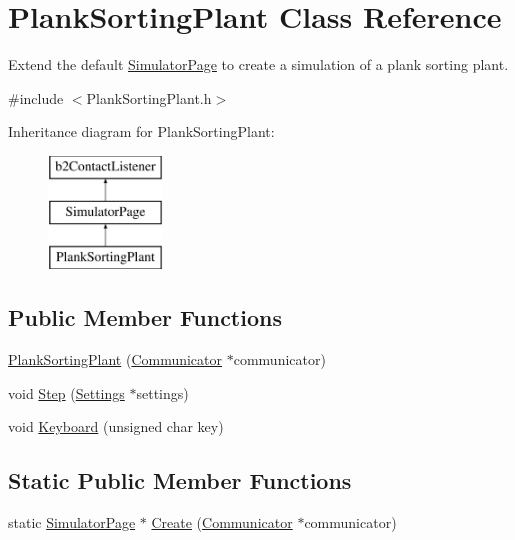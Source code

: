 \hypertarget{classPlankSortingPlant}{\section{Plank\-Sorting\-Plant Class Reference}
\label{classPlankSortingPlant}
}


Extend the default \hyperlink{classSimulatorPage}{Simulator\-Page} to create a simulation of a plank sorting plant.  




{\ttfamily \#include $<$Plank\-Sorting\-Plant.\-h$>$}

Inheritance diagram for Plank\-Sorting\-Plant\-:\begin{figure}[H]
\begin{center}
\leavevmode
\includegraphics[height=3.000000cm]{classPlankSortingPlant}
\end{center}
\end{figure}
\subsection*{Public Member Functions}
\begin{DoxyCompactItemize}
\item 
\hyperlink{classPlankSortingPlant_a1cb45c8ff425d982f421b8226d0ce578}{Plank\-Sorting\-Plant} (\hyperlink{classCommunicator}{Communicator} $\ast$communicator)
\item 
void \hyperlink{classPlankSortingPlant_a512555c258c6e6d824356af6ed2e77f2}{Step} (\hyperlink{structSettings}{Settings} $\ast$settings)
\item 
void \hyperlink{classPlankSortingPlant_a131fade1b547a3af4f2b5158bc285e30}{Keyboard} (unsigned char key)
\end{DoxyCompactItemize}
\subsection*{Static Public Member Functions}
\begin{DoxyCompactItemize}
\item 
static \hyperlink{classSimulatorPage}{Simulator\-Page} $\ast$ \hyperlink{classPlankSortingPlant_ad576fadff9a31216c061cabce2071cf8}{Create} (\hyperlink{classCommunicator}{Communicator} $\ast$communicator)
\end{DoxyCompactItemize}
